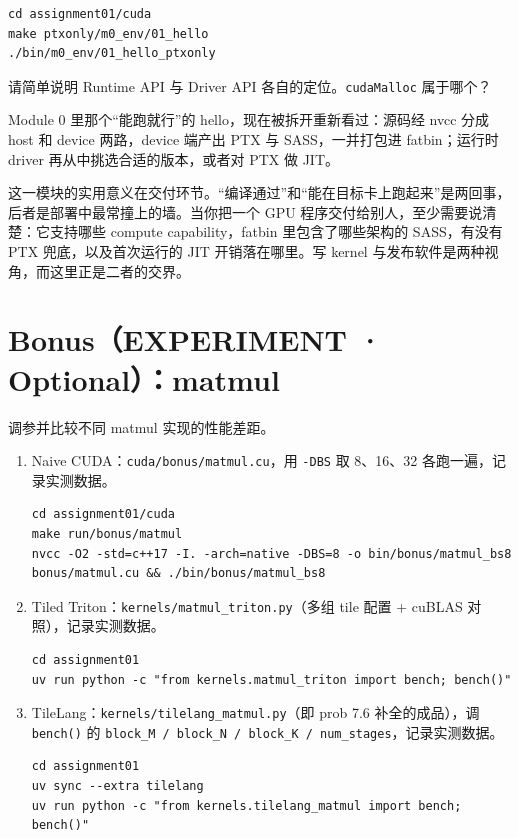 \documentclass[11pt,a4paper,fontset=none]{ctexart}
\begin{document}
\begin{lstlisting}
cd assignment01/cuda
make ptxonly/m0_env/01_hello
./bin/m0_env/01_hello_ptxonly
\end{lstlisting}

请简单说明 Runtime API 与 Driver API 各自的定位。\texttt{cudaMalloc} 属于哪个？

\begin{lookback}
Module 0 里那个“能跑就行”的 hello，现在被拆开重新看过：源码经 nvcc 分成 host 和 device 两路，device 端产出 PTX 与 SASS，一并打包进 fatbin；运行时 driver 再从中挑选合适的版本，或者对 PTX 做 JIT。

这一模块的实用意义在交付环节。“编译通过”和“能在目标卡上跑起来”是两回事，后者是部署中最常撞上的墙。当你把一个 GPU 程序交付给别人，至少需要说清楚：它支持哪些 compute capability，fatbin 里包含了哪些架构的 SASS，有没有 PTX 兜底，以及首次运行的 JIT 开销落在哪里。写 kernel 与发布软件是两种视角，而这里正是二者的交界。
\end{lookback}

\clearpage
\section*{Bonus（EXPERIMENT · Optional）：matmul}

调参并比较不同 matmul 实现的性能差距。

\begin{enumerate}[label=(\alph*)]
  \item Naive CUDA：\texttt{cuda/bonus/matmul.cu}，用 \texttt{-DBS} 取 8、16、32 各跑一遍，记录实测数据。
\begin{lstlisting}
cd assignment01/cuda
make run/bonus/matmul
nvcc -O2 -std=c++17 -I. -arch=native -DBS=8 -o bin/bonus/matmul_bs8 bonus/matmul.cu && ./bin/bonus/matmul_bs8
\end{lstlisting}
  \item Tiled Triton：\texttt{kernels/matmul\_triton.py}（多组 tile 配置 + cuBLAS 对照），记录实测数据。
\begin{lstlisting}
cd assignment01
uv run python -c "from kernels.matmul_triton import bench; bench()"
\end{lstlisting}
  \item TileLang：\texttt{kernels/tilelang\_matmul.py}（即 prob 7.6 补全的成品），调 \texttt{bench()} 的 \texttt{block\_M / block\_N / block\_K / num\_stages}，记录实测数据。
\begin{lstlisting}
cd assignment01
uv sync --extra tilelang
uv run python -c "from kernels.tilelang_matmul import bench; bench()"
\end{lstlisting}
\end{enumerate}
\end{document}
